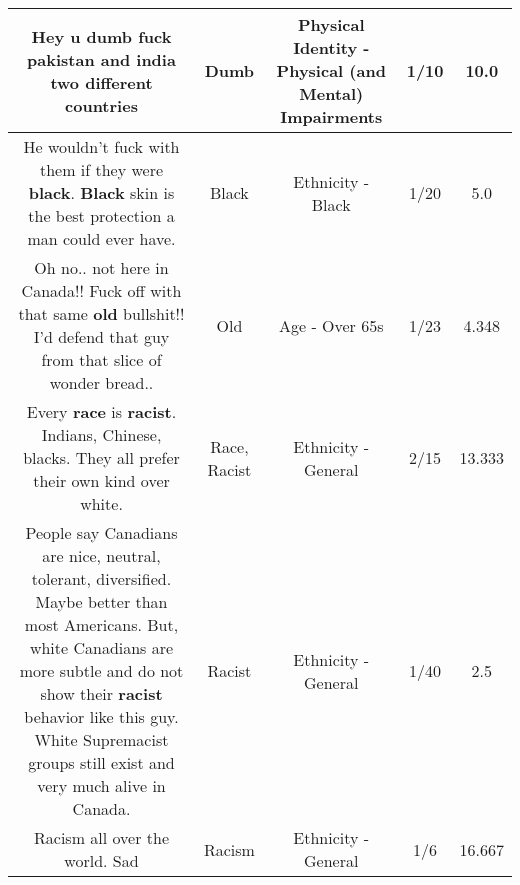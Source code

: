 \documentclass[11pt]{article}
\newlength\mylength
\begin{document}
\begin{center}
\begin{longtable}{|C{.65\mylength}|C{.30\mylength}|C{.12\mylength}|C{.12\mylength}|C{.12\mylength}|}
  \small Hey u \textbf{dumb} fuck pakistan and india two different countries\normalsize   & Dumb & Physical Identity - Physical (and Mental) Impairments & 1/10 & 10.0 \\  \hline
  \small He wouldn't fuck with them if they were \textbf{black}. \textbf{Black} skin is the best protection a man could ever have.\normalsize   & Black & Ethnicity - Black & 1/20 & 5.0 \\  \hline
  \small Oh no.. not here in Canada!! Fuck off with that same \textbf{old} bullshit!! I'd defend that guy from that slice of wonder bread..\normalsize   & Old & Age - Over 65s & 1/23 & 4.348 \\  \hline
  \small Every \textbf{race} is \textbf{racist}.  Indians,  Chinese,  blacks.  They all prefer their own kind over white.\normalsize   & Race, Racist & Ethnicity - General & 2/15 & 13.333 \\  \hline
  \small People say Canadians are nice, neutral, tolerant, diversified.  Maybe better than most Americans.  But, white Canadians are more subtle and do not show their \textbf{racist} behavior like this guy.  White Supremacist groups still exist and very much alive in Canada.\normalsize   & Racist & Ethnicity - General & 1/40 & 2.5 \\  \hline
  \small Racism all over the world. Sad\normalsize   & Racism & Ethnicity - General & 1/6 & 16.667 \\  \hline

\end{longtable}
\end{center}
\end{document}
